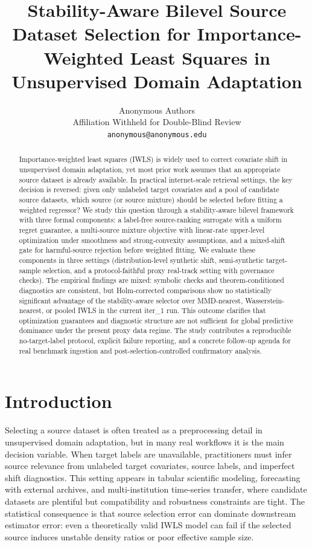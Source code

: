 \documentclass{article} %
\title{Stability-Aware Bilevel Source Dataset Selection for Importance-Weighted Least Squares in Unsupervised Domain Adaptation}
\author{Anonymous Authors \\
Affiliation Withheld for Double-Blind Review \\
\texttt{anonymous@anonymous.edu}}
\begin{document}
\maketitle

\begin{abstract}
Importance-weighted least squares (IWLS) is widely used to correct covariate shift in unsupervised domain adaptation, yet most prior work assumes that an appropriate source dataset is already available. In practical internet-scale retrieval settings, the key decision is reversed: given only unlabeled target covariates and a pool of candidate source datasets, which source (or source mixture) should be selected before fitting a weighted regressor? We study this question through a stability-aware bilevel framework with three formal components: a label-free source-ranking surrogate with a uniform regret guarantee, a multi-source mixture objective with linear-rate upper-level optimization under smoothness and strong-convexity assumptions, and a mixed-shift gate for harmful-source rejection before weighted fitting. We evaluate these components in three settings (distribution-level synthetic shift, semi-synthetic target-sample selection, and a protocol-faithful proxy real-track setting with governance checks). The empirical findings are mixed: symbolic checks and theorem-conditioned diagnostics are consistent, but Holm-corrected comparisons show no statistically significant advantage of the stability-aware selector over MMD-nearest, Wasserstein-nearest, or pooled IWLS in the current iter\_1 run. This outcome clarifies that optimization guarantees and diagnostic structure are not sufficient for global predictive dominance under the present proxy data regime. The study contributes a reproducible no-target-label protocol, explicit failure reporting, and a concrete follow-up agenda for real benchmark ingestion and post-selection-controlled confirmatory analysis.
\end{abstract}

\section{Introduction}
Selecting a source dataset is often treated as a preprocessing detail in unsupervised domain adaptation, but in many real workflows it is the main decision variable. When target labels are unavailable, practitioners must infer source relevance from unlabeled target covariates, source labels, and imperfect shift diagnostics. This setting appears in tabular scientific modeling, forecasting with external archives, and multi-institution time-series transfer, where candidate datasets are plentiful but compatibility and robustness constraints are tight. The statistical consequence is that source selection error can dominate downstream estimator error: even a theoretically valid IWLS model can fail if the selected source induces unstable density ratios or poor effective sample size.
\end{document}
